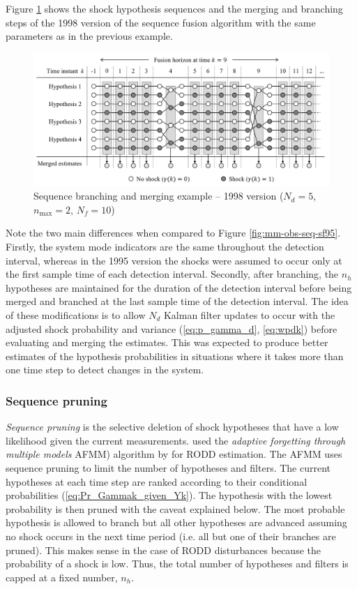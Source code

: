 Figure \ref{fig:mm-obs-seq-sf98} shows the shock hypothesis sequences and the merging and branching steps of the 1998 version of the sequence fusion algorithm with the same parameters as in the previous example.
\begin{figure}[ht]
	\centering
	\includegraphics[width=15cm]{images/mm_obs_seq_sf98.pdf}
	\caption{Sequence branching and merging example – 1998 version ($N_d=5$, $n_\text{max}=2$, $N_f=10$)}
	\label{fig:mm-obs-seq-sf98}
\end{figure}
Note the two main differences when compared to Figure \ref{fig:mm-obs-seq-sf95}. Firstly, the system mode indicators are the same throughout the detection interval, whereas in the 1995 version the shocks were assumed to occur only at the first sample time of each detection interval. Secondly, after branching, the $n_h$ hypotheses are maintained for the duration of the detection interval before being merged and branched at the last sample time of the detection interval. The idea of these modifications is to allow $N_d$ Kalman filter updates to occur with the adjusted shock probability and variance (\ref{eq:p_gamma_d}, \ref{eq:wpdk}) before evaluating and merging the estimates. This was expected to produce better estimates of the hypothesis probabilities in situations where it takes more than one time step to detect changes in the system.

\subsubsection{Sequence pruning} \label{sec:pruning}

\textit{Sequence pruning} is the selective deletion of shock hypotheses that have a low likelihood given the current measurements. \cite{eriksson_classification_1996} used the \textit{adaptive forgetting through multiple models} \gls{AFMM}) algorithm by \cite{andersson_adaptive_1985} for \gls{RODD} estimation. The \gls{AFMM} uses sequence pruning to limit the number of hypotheses and filters. The current hypotheses at each time step are ranked according to their conditional probabilities (\ref{eq:Pr_Gammak_given_Yk}). The hypothesis with the lowest probability is then pruned with the caveat explained below. The most probable hypothesis is allowed to branch but all other hypotheses are advanced assuming no shock occurs in the next time period (i.e. all but one of their branches are pruned). This makes sense in the case of \gls{RODD} disturbances because the probability of a shock is low. Thus, the total number of hypotheses and filters is capped at a fixed number, $n_h$.

